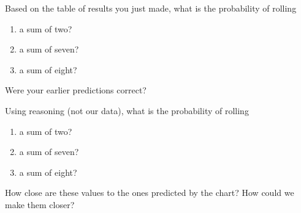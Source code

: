 \documentclass{ximera}
\begin{document}
\begin{problem}
Based on the table of results you just made, what is the probability of rolling
\begin{enumerate}
\item a sum of two?
\item a sum of seven?
\item a sum of eight?
\end{enumerate}
Were your earlier predictions correct?
\end{problem}

\begin{problem}
Using reasoning (not our data), what is the probability of rolling
\begin{enumerate}
\item a sum of two?
\item a sum of seven?
\item a sum of eight?
\end{enumerate}
How close are these values to the ones predicted by the chart?  How could we make them closer?
\end{problem}
\end{document}
